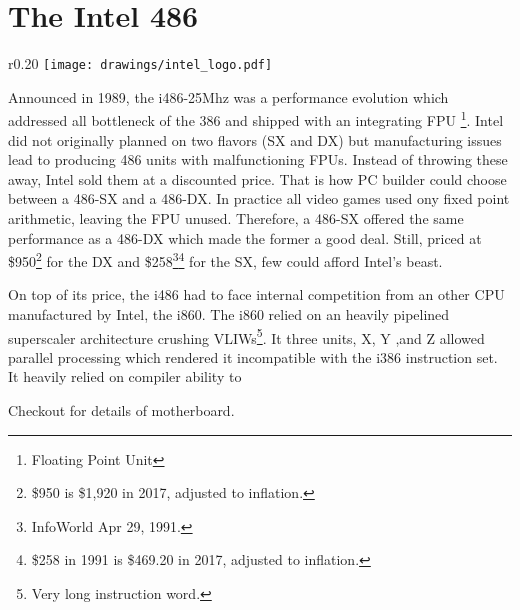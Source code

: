 \section{The Intel 486}

\begin{wrapfigure}[4]{r}{0.20\textwidth}
\centering
\texttt{[image: drawings/intel\_logo.pdf]}
\end{wrapfigure}

Announced in 1989, the i486-25Mhz was a performance evolution which addressed all bottleneck of the 386 and shipped with an integrating FPU \footnote{Floating Point Unit}. Intel did not originally planned on two flavors (SX and DX) but manufacturing issues lead to producing 486 units with malfunctioning FPUs. Instead of throwing these away, Intel sold them at a discounted price. That is how PC builder could choose between a 486-SX and a 486-DX. In practice all video games used ony fixed point arithmetic, leaving the FPU unused. Therefore, a 486-SX offered the same performance as a 486-DX which made the former a good deal. Still, priced at \$950\footnote{\$950 is \$1,920 in 2017, adjusted to inflation.} for the DX 
and \$258\footnote{InfoWorld Apr 29, 1991.}\footnote{\$258 in 1991 is \$469.20 in 2017, adjusted to inflation.} for the SX, few could afford Intel's beast.\\
\par
On top of its price, the i486 had to face internal competition from an other CPU manufactured by Intel, the i860. The i860 relied on an heavily pipelined superscaler architecture crushing VLIWs\footnote{Very long instruction word.}. It three units, X, Y ,and Z allowed parallel processing which rendered it incompatible with the i386 instruction set. It heavily relied on compiler ability to 

\par
Checkout  for details of motherboard.\\

